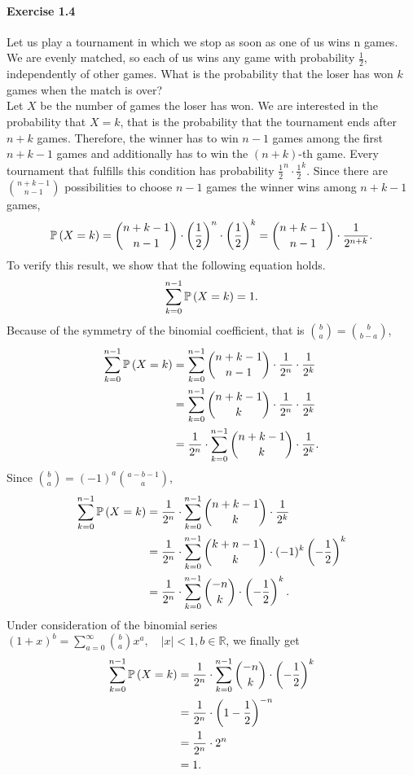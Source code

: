 \paragraph{Exercise 1.4} Let us play a tournament in which we stop as soon as one
of us wins n games. We are evenly matched, so each of us wins any game with
probability $\frac{1}{2}$, independently of other games. What is the probability
that the loser has won $k$ games when the match is over? \\[0.2cm]
Let $X$ be the number of games the loser has won. We are interested in the
probability that $X = k$, that is the probability that the tournament ends after
$n + k$ games. Therefore, the winner has to win $n-1$ games among the first
$n + k - 1$ games and additionally has to win the $(n+k)$-th game. Every tournament
that fulfills this condition has probability $\frac{1}{2}^n \cdot \frac{1}{2}^{k}$.
Since there are $\binom{n+k-1}{n-1}$ possibilities to choose $n-1$ games the winner
wins among $n+k-1$ games,
\[
  \mathbb{P}\left(X = k\right)
    = \binom{n+k-1}{n-1} \cdot \left(\frac{1}{2}\right)^n \cdot \left(\frac{1}{2}\right)^{k}
    = \binom{n+k-1}{n-1} \cdot \frac{1}{2^{n+k}}.
\]
To verify this result, we show that the following equation holds.
\[
  \sum_{k=0}^{n-1}\mathbb{P}\left(X=k\right) = 1.
\]
Because of the symmetry of the binomial coefficient, that is $\binom{b}{a} = \binom{b}{b - a}$,
\begin{align*}
  \sum_{k=0}^{n-1}\mathbb{P}\left(X=k\right)
    &= \sum_{k=0}^{n-1} \binom{n+k-1}{n-1} \cdot \frac{1}{2^n} \cdot \frac{1}{2^k} \\
    &= \sum_{k=0}^{n-1} \binom{n+k-1}{k} \cdot \frac{1}{2^n} \cdot \frac{1}{2^k} \\
    &= \frac{1}{2^n} \cdot \sum_{k=0}^{n-1} \binom{n+k-1}{k} \cdot \frac{1}{2^k}.
\end{align*}
Since $\binom{b}{a} = (-1)^a \binom{a - b - 1}{a}$,
\begin{align*}
  \sum_{k=0}^{n-1}\mathbb{P}\left(X=k\right)
    &= \frac{1}{2^n} \cdot \sum_{k=0}^{n-1} \binom{n+k-1}{k} \cdot \frac{1}{2^k} \\
    &= \frac{1}{2^n} \cdot \sum_{k=0}^{n-1} \binom{k+n-1}{k} \cdot (-1)^k \left(- \frac{1}{2}\right)^{k} \\
    &= \frac{1}{2^n} \cdot \sum_{k=0}^{n-1} \binom{-n}{k} \cdot \left(- \frac{1}{2}\right)^{k}.
\end{align*}
Under consideration of the binomial series $(1 + x)^b = \sum_{a=0}^{\infty}
\binom{b}{a}x^a, \quad |x| < 1, b \in \mathbb{R}$, we finally get
\begin{align*}
  \sum_{k=0}^{n-1}\mathbb{P}\left(X=k\right)
    &= \frac{1}{2^n} \cdot \sum_{k=0}^{n-1} \binom{-n}{k} \cdot \left(- \frac{1}{2}\right)^{k} \\
    &= \frac{1}{2^n} \cdot \left(1 - \frac{1}{2}\right)^{-n} \\
    &= \frac{1}{2^n} \cdot 2^n \\
    &= 1.
\end{align*}
